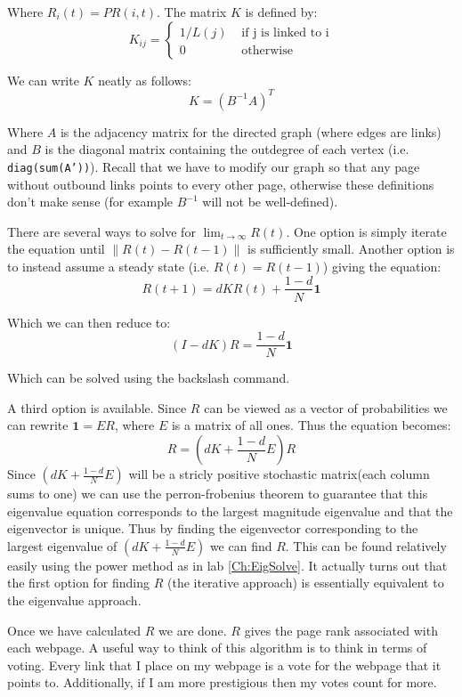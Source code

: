 Where $R_i(t) = PR(i,t)$. The matrix $K$ is defined by:
\[
K_{ij} = \begin{cases} 1/L(j) & \mbox{ if j is linked to i} \\ 0 & \mbox{ otherwise} \end{cases}
\]

We can write $K$ neatly as follows:
\[
K = (B^{-1}A)^T
\]

Where $A$ is the adjacency matrix for the directed graph (where edges are links) and $B$ is the diagonal matrix containing the outdegree of each vertex (i.e. {\tt diag(sum(A'))}). Recall that we have to modify our graph so that any page without outbound links points to every other page, otherwise these definitions don't make sense (for example $B^{-1}$ will not be well-defined).

There are several ways to solve for $\lim_{t \to \infty} R(t)$. One option is simply iterate the equation until $\|R(t)-R(t-1)\|$ is sufficiently small. Another option is to instead assume a steady state (i.e. $R(t) = R(t-1)$) giving the equation:
\[
R(t+1) = d K R(t) + \frac{1-d}{N} \mathbf{1}
\]

Which we can then reduce to:
\[
(I-dK)R = \frac{1-d}{N}\mathbf{1}
\]

Which can be solved using the backslash command. 

A third option is available. Since $R$ can be viewed as a vector of probabilities we can rewrite $\mathbf{1} = E R$, where $E$ is a matrix of all ones. Thus the equation becomes:
\[
R = (dK + \frac{1-d}{N}E)R
\]
Since $(dK + \frac{1-d}{N}E)$ will be a stricly positive stochastic matrix(each column sums to one) we can use the perron-frobenius theorem to guarantee that this eigenvalue equation corresponds to the largest magnitude eigenvalue and that the eigenvector is unique. Thus by finding the eigenvector corresponding to the largest eigenvalue of $(dK + \frac{1-d}{N}E)$ we can find $R$. This can be found relatively easily using the power method as in lab \ref{Ch:EigSolve}. It actually turns out that the first option for finding $R$ (the iterative approach) is essentially equivalent to the eigenvalue approach.

Once we have calculated $R$ we are done. $R$ gives the page rank associated with each webpage. A useful way to think of this algorithm is to think in terms of voting. Every link that I place on my webpage is a vote for the webpage that it points to. Additionally, if I am more prestigious then my votes count for more.

